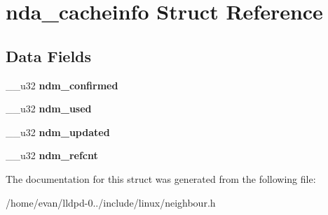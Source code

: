 \section{nda\-\_\-cacheinfo \-Struct \-Reference}
\label{structnda__cacheinfo}
\subsection*{\-Data \-Fields}
\begin{DoxyCompactItemize}
\item 
\-\_\-\-\_\-u32 {\bfseries ndm\-\_\-confirmed}\label{structnda__cacheinfo_ae242459987e8b957cf4e81da95bf3b6e}

\item 
\-\_\-\-\_\-u32 {\bfseries ndm\-\_\-used}\label{structnda__cacheinfo_a0415cb1755652a1b1061f9a3ee34a599}

\item 
\-\_\-\-\_\-u32 {\bfseries ndm\-\_\-updated}\label{structnda__cacheinfo_a51313bdeaa7d5139d367327d59722555}

\item 
\-\_\-\-\_\-u32 {\bfseries ndm\-\_\-refcnt}\label{structnda__cacheinfo_ae65ac84ee49f407afc5b28030e2dfa7b}

\end{DoxyCompactItemize}


\-The documentation for this struct was generated from the following file\-:\begin{DoxyCompactItemize}
\item 
/home/evan/lldpd-\/0../include/linux/neighbour.\-h\end{DoxyCompactItemize}
